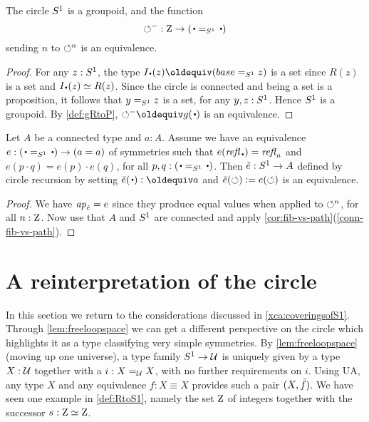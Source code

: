 \begin{corollary}\label{cor:S1groupoid}
The circle ${S^1}$ is a groupoid, and the function
\[
{\Sloop}^{-} : \zet\to(\base=_{\Sc}\base) %
\]
sending $n$ to $\circlearrowleft^n$ is an equivalence.
\end{corollary}
\begin{proof}
For any $z:{S^1}$, the type $\uc{\base}(z)\jdeq (base=_{\Sc}z)$ is a set 
since $R(z)$ is a set and $\uc{\base}(z) \equiv R(z)$.
Since the circle is connected and being a set is a proposition, it follows
that $y=_{{S^1}}z$ is a set, for any $y,z:{S^1}$. Hence ${S^1}$ is a groupoid.
By \cref{def:gRtoP}, ${\Sloop}^{-}\jdeq g(\base)$ is an equivalence.
\end{proof}

\begin{lemma}\label{lem:S1-loops}
Let $A$ be a connected type and $a:A$. 
Assume we have an equivalence $e:(\base=_{\Sc}\base) \to (a=a)$
of symmetries such that $e(\refl{\base})=\refl{a}$
and $e(p\cdot q)=e(p)\cdot e(q)$, for all $p,q:(\base=_{\Sc}\base)$.
Then $\check e : {S^1}\to A$ defined by circle recursion by setting
$\check e(\base)\defeq a$ and $\check e(\circlearrowleft)\vcentcolon= e(\circlearrowleft)$
is an equivalence.
\end{lemma}
\begin{proof}
We have $\mathop{{\it ap}_{\check e}} = e$ since they produce equal values when applied
to $\circlearrowleft^n$, for all $n:\mathrm{Z}$. Now use that $A$ and ${S^1}$ are connected and
apply \cref{cor:fib-vs-path}(\ref{conn-fib-vs-path}).
\end{proof}

\section{A reinterpretation of the circle}
\label{sec:S1isC}
In this section we return to the considerations discussed in \cref{xca:coveringsofS1}.
Through \cref{lem:freeloopspace} we can get a different perspective on the circle which highlights it as a type classifying very simple symmetries.
By \cref{lem:freeloopspace} (moving up one universe), a type family ${S^1}\to\mathcal{U}$ is uniquely given by a type $X:\mathcal{U}$ together with a $i:X=_{\mathcal{U}} X$, with no further requirements on $i$.
Using UA, any type $X$ and any equivalence $f: X\equiv X$ provides such a pair
$(X,\bar {f})$. We have seen one example in \cref{def:RtoS1}, 
namely the set $\mathrm{Z}$ of integers together with the successor $s: \mathrm{Z}\simeq\mathrm{Z}$.

